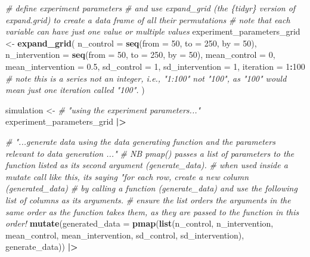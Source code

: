\documentclass[
]{article}
\newenvironment{Shaded}{\begin{snugshade}}{\end{snugshade}}
\newcommand{\AttributeTok}[1]{\textcolor[rgb]{0.13,0.29,0.53}{#1}}
\newcommand{\CommentTok}[1]{\textcolor[rgb]{0.56,0.35,0.01}{\textit{#1}}}
\newcommand{\DecValTok}[1]{\textcolor[rgb]{0.00,0.00,0.81}{#1}}
\newcommand{\FloatTok}[1]{\textcolor[rgb]{0.00,0.00,0.81}{#1}}
\newcommand{\FunctionTok}[1]{\textcolor[rgb]{0.13,0.29,0.53}{\textbf{#1}}}
\newcommand{\NormalTok}[1]{#1}
\newcommand{\OtherTok}[1]{\textcolor[rgb]{0.56,0.35,0.01}{#1}}
\newcommand{\SpecialCharTok}[1]{\textcolor[rgb]{0.81,0.36,0.00}{\textbf{#1}}}
\begin{document}
\begin{Shaded}
\begin{Highlighting}[]
\CommentTok{\# define experiment parameters}
\CommentTok{\# and use expand\_grid (the \{tidyr\} version of expand.grid) to create a data frame of all their permutations}
\CommentTok{\# note that each variable can have just one value or multiple values}
\NormalTok{experiment\_parameters\_grid }\OtherTok{\textless{}{-}} \FunctionTok{expand\_grid}\NormalTok{(}
  \AttributeTok{n\_control =} \FunctionTok{seq}\NormalTok{(}\AttributeTok{from =} \DecValTok{50}\NormalTok{, }\AttributeTok{to =} \DecValTok{250}\NormalTok{, }\AttributeTok{by =} \DecValTok{50}\NormalTok{),}
  \AttributeTok{n\_intervention =} \FunctionTok{seq}\NormalTok{(}\AttributeTok{from =} \DecValTok{50}\NormalTok{, }\AttributeTok{to =} \DecValTok{250}\NormalTok{, }\AttributeTok{by =} \DecValTok{50}\NormalTok{),}
  \AttributeTok{mean\_control =} \DecValTok{0}\NormalTok{,}
  \AttributeTok{mean\_intervention =} \FloatTok{0.5}\NormalTok{,}
  \AttributeTok{sd\_control =} \DecValTok{1}\NormalTok{,}
  \AttributeTok{sd\_intervention =} \DecValTok{1}\NormalTok{,}
  \AttributeTok{iteration =} \DecValTok{1}\SpecialCharTok{:}\DecValTok{100} \CommentTok{\# note this is a series not an integer, i.e., "1:100" not "100", as "100" would mean just one iteration called "100".}
\NormalTok{)}

  
\NormalTok{simulation }\OtherTok{\textless{}{-}} 
  \CommentTok{\# "using the experiment parameters..."}
\NormalTok{  experiment\_parameters\_grid }\SpecialCharTok{|\textgreater{}}
  
  \CommentTok{\# "...generate data using the data generating function and the parameters relevant to data generation ..."}
  \CommentTok{\# NB pmap() passes a list of parameters to the function listed as its second argument (generate\_data).}
  \CommentTok{\# when used inside a mutate call like this, its saying "for each row, create a new column (generated\_data)}
  \CommentTok{\# by calling a function (generate\_data) and use the following list of columns as its arguments.}
  \CommentTok{\# ensure the list orders the arguments in the same order as the function takes them, as they are passed to the function in this order!}
  \FunctionTok{mutate}\NormalTok{(}\AttributeTok{generated\_data =} \FunctionTok{pmap}\NormalTok{(}\FunctionTok{list}\NormalTok{(n\_control, }
\NormalTok{                                    n\_intervention,}
\NormalTok{                                    mean\_control,}
\NormalTok{                                    mean\_intervention,}
\NormalTok{                                    sd\_control,}
\NormalTok{                                    sd\_intervention),}
\NormalTok{                               generate\_data)) }\SpecialCharTok{|\textgreater{}}
  

\end{Highlighting}
\end{Shaded}
\end{document}
